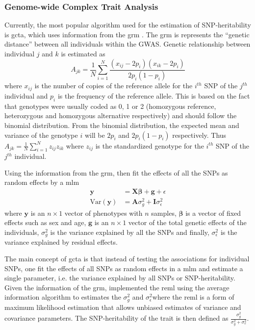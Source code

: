 	\subsubsection{Genome-wide Complex Trait Analysis}
	Currently, the most popular algorithm used for the estimation of \gls{SNP}-heritability is \gls{gcta}, which uses information from the \gls{grm} \citep{Yang2011}.
	The \gls{grm} is represents the ``genetic distance'' between all individuals within the \gls{GWAS}.
	Genetic relationship between individual $j$ and $k$ is estimated as 
	\begin{equation}
	A_{jk} = \frac{1}{N}\sum^N_{i=1}\frac{(x_{ij}-2p_i)(x_{ik}-2p_i)}{2p_i(1-p_i)}
	\end{equation}
	where $x_{ij}$ is the number of copies of the reference allele for the $i^{th}$ \gls{SNP} of the $j^{th}$ individual and $p_i$ is the frequency of the reference allele.
	This is based on the fact that genotypes were usually coded as 0, 1 or 2 (homozygous reference, heterozygous and homozygous alternative respectively) and should follow the binomial distribution.
	From the binomial distribution, the expected mean and variance of the genotype $i$ will be $2p_i$ and $2p_i(1-p_i)$ respectively.
	Thus $A_{jk} = \frac{1}{N}\sum^N_{i=1}z_{ij}z_{ik}$ where $z_{ij}$ is the standardized genotype for the $i^{th}$ \gls{SNP} of the $j^{th}$ individual.
	
	Using the information from the \gls{grm}, \citet{Yang2011} then fit the effects of all the \glspl{SNP} as random effects by a \gls{mlm}
	\begin{align}
	\boldsymbol{y} &= \boldsymbol{X\beta}+\boldsymbol{g}+\epsilon\\
	\mathrm{Var}(\boldsymbol{y}) &= \boldsymbol{A}\sigma_g^2+\boldsymbol{I}\sigma_\epsilon^2
	\end{align}
	where $\boldsymbol{y}$ is an $n\times 1$ vector of phenotypes with $n$ samples, $\boldsymbol{\beta}$ is a vector of fixed effects such as sex and age, $\boldsymbol{g}$ is an $n\times 1$ vector of the total genetic effects of the individuals, $\sigma_g^2$ is the variance explained by all the \glspl{SNP} and finally, $\sigma_\epsilon^2$ is the variance explained by residual effects.

	The main concept of \gls{gcta} is that instead of testing the associations for individual \glspl{SNP}, one fit the effects of all \glspl{SNP} as random effects in a \gls{mlm} and estimate a single parameter, i.e. the variance explained by all \glspl{SNP} or \gls{SNP}-heritability.
	Given the information of the \gls{grm}, \citet{Yang2011} implemented the \gls{reml} using the average information algorithm to estimates the $\sigma_g^2$ and $\sigma_\epsilon^2$where the \gls{reml} is a form of maximum likelihood estimation that allows unbiased estimates of variance and covariance parameters.
	The \gls{SNP}-heritability of the trait is then defined as $\frac{\sigma_g^2}{\sigma_g^2+\sigma_e^2}$.

